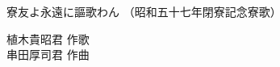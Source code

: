 \documentclass[10pt,b5j]{tarticle} %
\begin{document}
\begin{minipage}[c]{0.7\hsize} %
    \begin{center}
        {\LARGE
            寮友よ永遠に謳歌わん %
        }
        {\small 
            （昭和五十七年閉寮記念寮歌） %
        }
    \end{center}
\end{minipage}
\begin{minipage}[c]{0.3\hsize} %
    \begin{flushright} %
        植木貴昭君 作歌\\串田厚司君 作曲 %
    \end{flushright}
\end{minipage}
\end{document}
